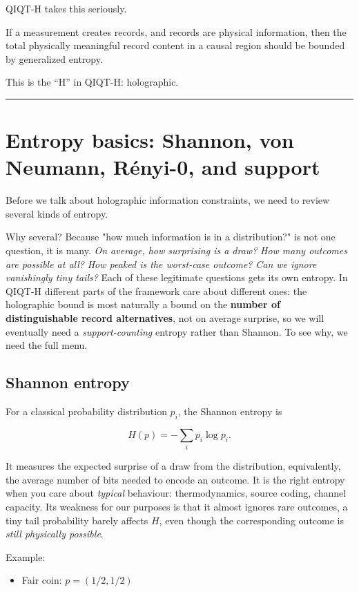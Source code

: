 \documentclass[11pt,a4paper]{article}
\begin{document}
QIQT-H takes this seriously.

If a measurement creates records, and records are physical information, then the total physically meaningful record content in a causal region should be bounded by generalized entropy.

This is the “H” in QIQT-H: holographic.

\medskip\hrule\medskip

\section{Entropy basics: Shannon, von Neumann, Rényi-0, and support}

Before we talk about holographic information constraints, we need to review several kinds of entropy.

Why several? Because "how much information is in a distribution?" is not one question, it is many. \emph{On average, how surprising is a draw?} \emph{How many outcomes are possible at all?} \emph{How peaked is the worst-case outcome?} \emph{Can we ignore vanishingly tiny tails?} Each of these legitimate questions gets its own entropy. In QIQT-H different parts of the framework care about different ones: the holographic bound is most naturally a bound on the \textbf{number of distinguishable record alternatives}, not on average surprise, so we will eventually need a \emph{support-counting} entropy rather than Shannon. To see why, we need the full menu.

\subsection{Shannon entropy}

For a classical probability distribution $p_i$, the Shannon entropy is

\[
H(p) = -\sum_i p_i \log p_i.
\]

It measures the expected surprise of a draw from the distribution, equivalently, the average number of bits needed to encode an outcome. It is the right entropy when you care about \emph{typical} behaviour: thermodynamics, source coding, channel capacity. Its weakness for our purposes is that it almost ignores rare outcomes, a tiny tail probability barely affects $H$, even though the corresponding outcome is \emph{still physically possible}.

Example:

\begin{itemize}
  \item Fair coin: $p=(1/2,1/2)$
\end{itemize}
\end{document}

